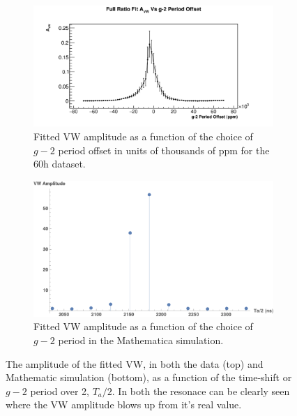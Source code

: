 \documentclass[12pt,letterpaper]{article}
\def\gmtwo{$g-2$\xspace}
\begin{document}
\begin{figure}[]
\centering
    \begin{subfigure}[t]{0.8\textwidth}
        \centering
        \includegraphics[width=\textwidth]{AvwResonance_60h}
        \caption{Fitted VW amplitude as a function of the choice of \gmtwo period offset in units of thousands of ppm for the 60h dataset.}
    \end{subfigure}%
    \vspace{1cm}
    \begin{subfigure}[t]{0.6\textwidth}
        \centering
        \includegraphics[width=\textwidth]{AvwResonance_Mathematica}
        \caption{Fitted VW amplitude as a function of the choice of \gmtwo period in the Mathematica simulation.}
    \end{subfigure}
\caption[]{The amplitude of the fitted VW, in both the data (top) and Mathematic simulation (bottom), as a function of the time-shift or \gmtwo period over 2, $T_{a}/2$. In both the resonace can be clearly seen where the VW amplitude blows up from it's real value.}
\label{fig:resonance}
\end{figure}

\clearpage
\end{document}
